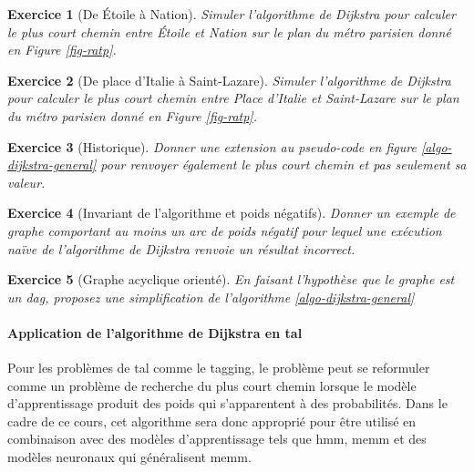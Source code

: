 \documentclass[11pt,openany]{book}
\newtheorem{exo}{Exercice}[chapter]
\newcommand{\ac}[1]{{\sc #1}} %
\begin{document}
\begin{exo}[De \'Etoile à Nation]
Simuler l'algorithme de Dijkstra pour calculer le plus court chemin
entre \'Etoile et Nation sur le plan du métro parisien donné en Figure \ref{fig-ratp}.
\end{exo}
\begin{exo}[De place d'Italie à Saint-Lazare]
Simuler l'algorithme de Dijkstra pour calculer le plus court chemin
entre Place d'Italie et Saint-Lazare sur le plan du métro parisien donné en Figure \ref{fig-ratp}.
\end{exo}
\begin{center}
\end{center}

\begin{exo}[Historique]
Donner une extension au pseudo-code en figure
\ref{algo-dijkstra-general} pour renvoyer également le plus court
chemin et pas seulement sa valeur.
\end{exo}
\begin{exo}[Invariant de l'algorithme et poids négatifs]
Donner un exemple de graphe comportant au moins un arc de poids
négatif pour lequel une exécution naïve de l'algorithme de Dijkstra
renvoie un résultat incorrect.
\end{exo}
\begin{exo}[Graphe acyclique orienté]
En faisant l'hypothèse que le graphe est un \ac{dag}, proposez une
simplification de l'algorithme \ref{algo-dijkstra-general}
\end{exo}

\paragraph{Application de l'algorithme de Dijkstra en \ac{tal}} 
 Pour les problèmes de \ac{tal} comme le tagging, le problème peut se
 reformuler comme un problème de recherche du plus court chemin
 lorsque le modèle d'apprentissage produit des poids qui s'apparentent
 à des probabilités.  Dans le cadre de ce cours, cet algorithme sera donc approprié pour
être utilisé en combinaison avec des modèles d'apprentissage tels que
\ac{hmm}, \ac{memm} et des modèles neuronaux qui généralisent \ac{memm}.
\end{document}
